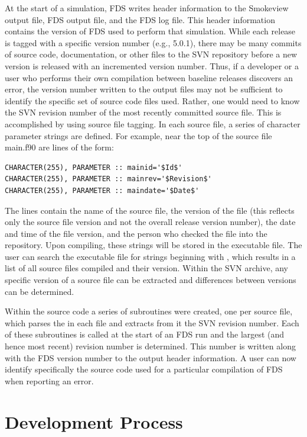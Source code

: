 \documentclass[11pt]{book}
\begin{document}
At the start of a simulation, FDS writes header information to the Smokeview output file, FDS output file, and the FDS log file.  This header information contains the version of FDS used to perform that simulation. While each release is tagged with a specific version number (e.g., 5.0.1), there may be many commits of source code, documentation, or other files to the SVN repository before a new version is released with an incremented version number.  Thus, if a developer or a user who performs their own compilation between baseline releases discovers an error, the version number written to the output files may not be sufficient to identify the specific set of source code files used.  Rather, one would need to know the SVN revision number of the most recently committed source file. This is accomplished by using source file tagging. In each source file, a series of character parameter strings are defined. For example, near the top of the source file {\ct main.f90} are lines of the form:
\begin{lstlisting}
CHARACTER(255), PARAMETER :: mainid='$Id$'
CHARACTER(255), PARAMETER :: mainrev='$Revision$'
CHARACTER(255), PARAMETER :: maindate='$Date$'
\end{lstlisting}
The lines contain the name of the source file, the version of the file (this reflects only the source file version and not the overall release version number), the date and time of the file version, and the person who checked the file into the repository. Upon compiling, these strings will be stored in the executable file.  The user can search the executable file for strings beginning with , which results in a list of all source files compiled and their version. Within the SVN archive, any specific version of a source file can be extracted and differences between versions can be determined.

Within the source code a series of subroutines were created, one per source file, which parses the  in each file and extracts from it the SVN revision number.  Each of these subroutines is called at the start of an FDS run and the largest (and hence most recent) revision number is determined.  This number is written along with the FDS version number to the output header information.  A user can now identify specifically the source code used for a particular compilation of FDS when reporting an error.


\section{Development Process}
\end{document}

